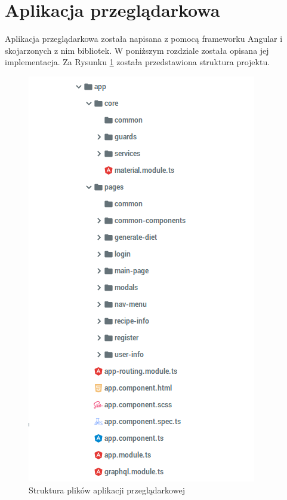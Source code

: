 \section{Aplikacja przeglądarkowa}
Aplikacja przeglądarkowa została napisana z pomocą frameworku Angular i skojarzonych z nim bibliotek. W poniższym rozdziale została opisana jej implementacja. Za Rysunku \ref{fig:front_schem} została przedstawiona struktura projektu.


\begin{figure}[H]
\centering
\includegraphics[width=.7\textwidth]{rys/front-schem.png}
\caption{Struktura plików aplikacji przeglądarkowej}
\label{fig:front_schem}
\end{figure}

